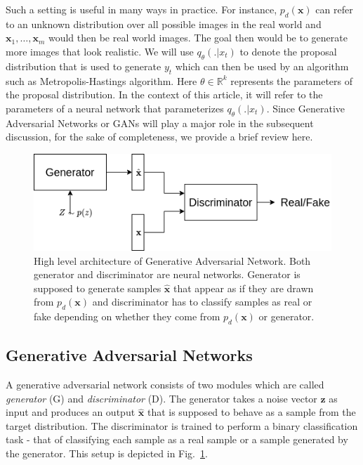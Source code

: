 \documentclass[letterpaper,english,10pt]{article}
\begin{document}
Such a setting is useful in many ways in practice. For instance, $p_d(\mathbf{x})$ can refer to an unknown distribution over all possible images in the real world and $\mathbf{x}_1, \dots, \mathbf{x}_m$ would then be real world images. The goal then would be to generate more images that look realistic. We will use $q_\theta(.|x_t)$ to denote the proposal distribution that is used to generate $y_t$ which can then be used by an algorithm such as Metropolis-Hastings algorithm. Here $\theta \in \mathbb{R}^k$ represents the parameters of the proposal distribution. In the context of this article, it will refer to the parameters of a neural network that parameterizes $q_\theta(. | x_t)$. Since Generative Adversarial Networks or GANs \cite{GoodfellowEtAl:2014:GenerativeAdversarialNetworks} will play a major role in the subsequent discussion, for the sake of completeness, we provide a brief review here.


\begin{figure}
    \centering
    \includegraphics[scale=0.6]{./Figures/gan.png}
    \caption{High level architecture of Generative Adversarial Network. Both generator and discriminator are neural networks. Generator is supposed to generate samples $\hat{\mathbf{x}}$ that appear as if they are drawn from $p_d(\mathbf{x})$ and discriminator has to classify samples as real or fake depending on whether they come from $p_d(\mathbf{x})$ or generator.}
    \label{fig:gan}
\end{figure}

\subsection{Generative Adversarial Networks}
A generative adversarial network consists of two modules which are called \textit{generator} (G) and \textit{discriminator} (D). The generator takes a noise vector $\mathbf{z}$ as input and produces an output $\hat{\mathbf{x}}$ that is supposed to behave as a sample from the target distribution. The discriminator is trained to perform a binary classification task - that of classifying each sample as a real sample or a sample generated by the generator. This setup is depicted in Fig.~\ref{fig:gan}.
\end{document}
